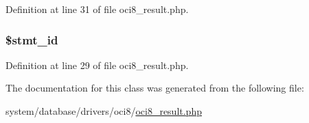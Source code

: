 Definition at line 31 of file oci8\-\_\-result.\-php.

\hypertarget{class_c_i___d_b__oci8__result_a1a97f17fd259cd27c73b65e6c3706ec0}{
\subsubsection[{\$stmt\-\_\-id}]{\setlength{\rightskip}{0pt plus 5cm}\$stmt\-\_\-id}}\label{class_c_i___d_b__oci8__result_a1a97f17fd259cd27c73b65e6c3706ec0}


Definition at line 29 of file oci8\-\_\-result.\-php.



The documentation for this class was generated from the following file\-:\begin{DoxyCompactItemize}
\item 
system/database/drivers/oci8/\hyperlink{oci8__result_8php}{oci8\-\_\-result.\-php}\end{DoxyCompactItemize}
